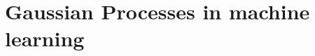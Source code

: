 \documentclass[11pt]{article}
\begin{document}
\section{Gaussian Processes in machine learning}
\end{document}

